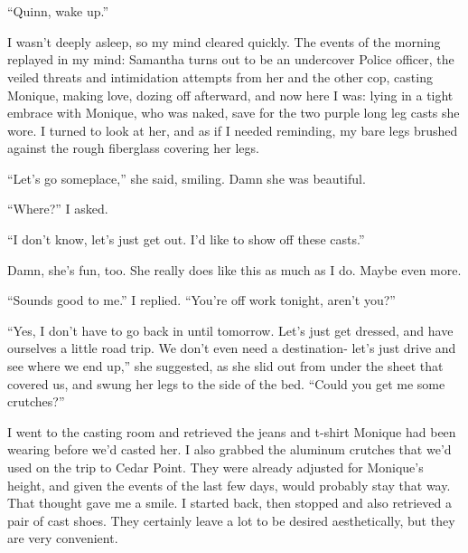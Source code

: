 \chapter{~}
``Quinn, wake up.''

I wasn't deeply asleep, so my mind cleared quickly. The events of the morning replayed in
my mind: Samantha turns out to be an undercover Police officer, the veiled threats and
intimidation attempts from her and the other cop, casting Monique, making love, dozing off
afterward, and now here I was: lying in a tight embrace with Monique, who was naked, save for
the two purple long leg casts she wore. I turned to look at her, and as if I needed reminding,
my bare legs brushed against the rough fiberglass covering her legs.

``Let's go someplace,'' she said, smiling. Damn she was beautiful.

``Where?'' I asked.

``I don't know, let's just get out. I'd like to show off these casts.''

Damn, she's fun, too. She really does like this as much as I do. Maybe even more.

``Sounds good to me.'' I replied. ``You're off work tonight, aren't you?''

``Yes, I don't have to go back in until tomorrow. Let's just get dressed, and have ourselves
a little road trip. We don't even need a destination- let's just drive and see where we end
up,''
she suggested, as she slid out from under the sheet that covered us, and swung her legs to the
side of the bed. ``Could you get me some crutches?''

I went to the casting room and retrieved the jeans and t-shirt Monique had been wearing
before we'd casted her. I also grabbed the aluminum crutches that we'd used on the trip to Cedar
Point. They were already adjusted for Monique's height, and given the events of the last few
days, would probably stay that way. That thought gave me a smile. I started back, then stopped
and also retrieved a pair of cast shoes. They certainly leave a lot to be desired aesthetically,
but they are very convenient.

